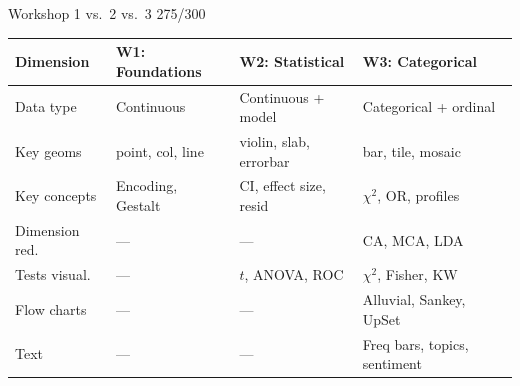 \documentclass[10pt]{beamer}
\newcommand{\smark}[1]{\hfill{\scriptsize\color{codegray}#1}}
\begin{document}
\begin{frame}{Workshop 1 vs.\ 2 vs.\ 3}
\smark{275/300}
\centering\small
\begin{tabular}{@{}llll@{}}
    \toprule
    \textbf{Dimension} & \textbf{W1: Foundations} & \textbf{W2: Statistical} & \textbf{W3: Categorical} \\
    \midrule
    Data type    & Continuous           & Continuous + model      & Categorical + ordinal \\
    Key geoms    & point, col, line     & violin, slab, errorbar  & bar, tile, mosaic \\
    Key concepts & Encoding, Gestalt    & CI, effect size, resid  & $\chi^2$, OR, profiles \\
    Dimension red.& ---                 & ---                     & CA, MCA, LDA \\
    Tests visual.& ---                  & $t$, ANOVA, ROC         & $\chi^2$, Fisher, KW \\
    Flow charts  & ---                  & ---                     & Alluvial, Sankey, UpSet \\
    Text         & ---                  & ---                     & Freq bars, topics, sentiment \\
    \bottomrule
\end{tabular}
\end{frame}
\end{document}
